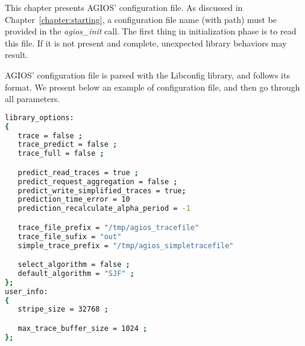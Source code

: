 This chapter presents AGIOS' configuration file. As discussed in Chapter~\ref{chapter:starting}, a configuration file name (with path) must be provided in the \emph{agios\_init} call. The first thing in initialization phase is to read this file. If it is not present and complete, unexpected library behaviors may result.

AGIOS' configuration file is parsed with the Libconfig library, and follows its format. We present below an example of configuration file, and then go through all parameters.

\begin{lstlisting}[language=bash, breaklines=true]
library_options:
{
   trace = false ;
   trace_predict = false ;
   trace_full = false ;

   predict_read_traces = true ;
   predict_request_aggregation = false ;
   predict_write_simplified_traces = true;
   prediction_time_error = 10
   prediction_recalculate_alpha_period = -1

   trace_file_prefix = "/tmp/agios_tracefile"
   trace_file_sufix = "out"
   simple_trace_prefix = "/tmp/agios_simpletracefile"

   select_algorithm = false ;
   default_algorithm = "SJF" ;
};
user_info:
{
   stripe_size = 32768 ;

   max_trace_buffer_size = 1024 ;
};
\end{lstlisting}

